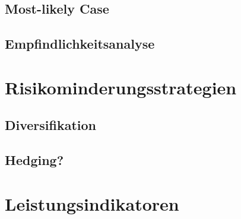 \subsection{Most-likely Case}

\subsection{Empfindlichkeitsanalyse}

\section{Risikominderungsstrategien}

\subsection{Diversifikation}

\subsection{Hedging?}

\section{Leistungsindikatoren}

